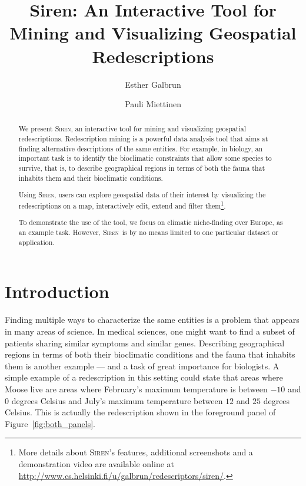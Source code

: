 \documentclass{llncs}
\newcommand{\Siren}{\textsc{Siren}}
\begin{document}
\title{Siren: An Interactive Tool for Mining and Visualizing Geospatial Redescriptions}

\author{
Esther Galbrun
\and
Pauli Miettinen
}

 
\maketitle
\begin{abstract}
  We present \Siren, an interactive tool for mining and visualizing
  geospatial redescriptions.  Redescription mining is a powerful data
  analysis tool that aims at finding alternative descriptions of the
  same entities.  For example, in biology, an important task is to
  identify the bioclimatic constraints that allow some species to
  survive, that is, to describe geographical regions in terms of both
  the fauna that inhabits them and their bioclimatic conditions.
  
  Using \Siren, users can explore geospatial data of their interest by
  visualizing the redescriptions on a map, interactively edit, extend
  and filter them\footnote{More details about \Siren's features,
    additional screenshots and a demonstration video are available
    online at
    \url{http://www.cs.helsinki.fi/u/galbrun/redescriptors/siren/}.}.

  To demonstrate the use of the tool, we focus on climatic
  niche-finding over Europe, as an example task. However, \Siren\ is by
  no means limited to one particular dataset or application.
\end{abstract}

\section{Introduction}
Finding multiple ways to characterize the same entities is a problem
that appears in many areas of science.  In medical sciences, one might
want to find a subset of patients sharing similar symptoms and similar
genes. Describing geographical regions in terms of both their
bioclimatic conditions and the fauna that inhabits them is another
example --- and a task of great importance for biologists.  A 
simple example of a redescription in this setting could state that areas
where Moose live are areas where February's maximum temperature is
between $-10$ and $0$ degrees Celsius and July's maximum temperature
between $12$ and $25$ degrees Celsius. This is actually the
redescription shown in the foreground panel of
Figure~\ref{fig:both_panels}.
\end{document}
